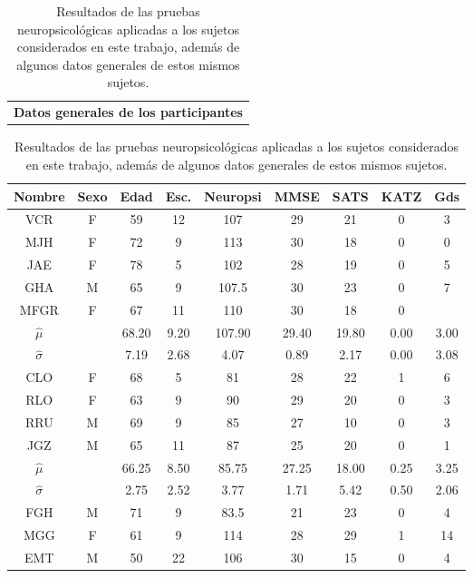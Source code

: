 \documentclass[12pt,a4paper]{mitthesis}
\begin{document}
\begin{table}
\centering
\begin{tabular}{c}
\textbf{Datos generales de los participantes}
\vspace{1em}
\end{tabular}
\begin{small}
\begin{tabular}{c|ccc|ccccc}
\textbf{Nombre} & \textbf{Sexo} & \textbf{Edad} & \textbf{Esc.} & \textbf{Neuropsi} & \textbf{MMSE} & \textbf{SATS} & \textbf{KATZ} & \textbf{Gds} \\
\hline 
\hline 
VCR    & F    & 59   & 12   & 107      & 29   & 21   & 0    & 3 \\
MJH    & F    & 72   & 9    & 113      & 30   & 18   & 0    & 0 \\
JAE    & F    & 78   & 5    & 102      & 28   & 19   & 0    & 5 \\
GHA    & M    & 65   & 9    & 107.5    & 30   & 23   & 0    & 7 \\
MFGR   & F    & 67   & 11   & 110      & 30   & 18   & 0    &   \\
\hline 
$\widehat{\mu}$ & 
              & 68.20& 9.20 & 107.90   & 29.40& 19.80& 0.00 & 3.00\\
$\widehat{\sigma}$ & 
              & 7.19 & 2.68 & 4.07     & 0.89 & 2.17 & 0.00 & 3.08\\
\hline 
\hline 
CLO    & F    & 68   & 5    & 81       & 28   & 22   & 1    & 6 \\
RLO    & F    & 63   & 9    & 90       & 29   & 20   & 0    & 3 \\
RRU    & M    & 69   & 9    & 85       & 27   & 10   & 0    & 3 \\
JGZ    & M    & 65   & 11   & 87       & 25   & 20   & 0    & 1 \\
\hline 
$\widehat{\mu}$ & 
              & 66.25& 8.50 & 85.75   & 27.25& 18.00& 0.25 & 3.25\\
$\widehat{\sigma}$ & 
              & 2.75 & 2.52 & 3.77    & 1.71 & 5.42 & 0.50 & 2.06\\
\hline 
\hline 
FGH    & M    & 71   & 9    & 83.5     & 21   & 23   & 0    & 4  \\
MGG    & F    & 61   & 9    & 114      & 28   & 29   & 1    & 14 \\
EMT    & M    & 50   & 22   & 106      & 30   & 15   & 0    & 4  \\
\end{tabular} 
\end{small}
\label{tab_sujetos}
\caption{Resultados de las pruebas neuropsicol\'ogicas aplicadas a los sujetos considerados en este 
trabajo, adem\'as de algunos datos generales de estos mismos sujetos. 
}
\end{table}
\end{document}
